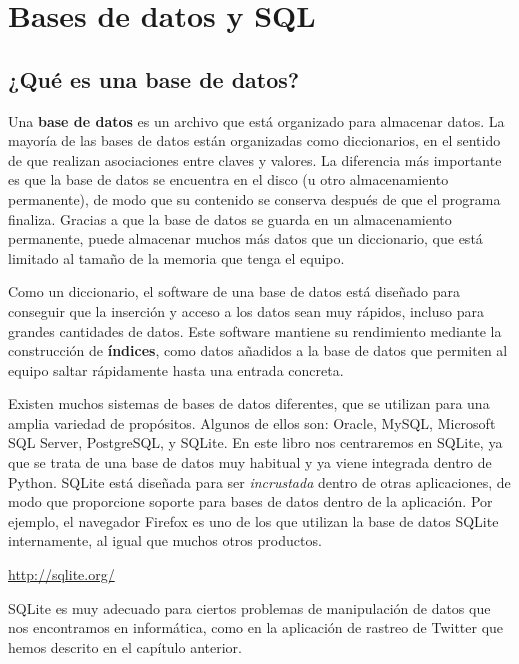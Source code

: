
\chapter{Bases de datos y SQL}

\section{¿Qué es una base de datos?}

Una {\bf base de datos} es un archivo que está organizado para almacenar datos.
La mayoría de las bases de datos están organizadas como diccionarios, en el sentido
de que realizan asociaciones entre claves y valores. La diferencia más importante
es que la base de datos se encuentra en el disco (u otro almacenamiento permanente),
de modo que su contenido se conserva después de que el programa finaliza. Gracias a que la base de
datos se guarda en un almacenamiento permanente, puede almacenar muchos más datos que
un diccionario, que está limitado al tamaño de la memoria
que tenga el equipo.

Como un diccionario, el software de una base de datos está diseñado para conseguir que
la inserción y acceso a los datos sean muy rápidos, incluso para grandes
cantidades de datos. Este software mantiene su rendimiento mediante la
construcción de {\bf índices}, como datos añadidos a la base de datos
que permiten al equipo saltar rápidamente hasta una entrada
concreta.

Existen muchos sistemas de bases de datos diferentes, que se utilizan para una
amplia variedad de propósitos. Algunos de ellos son: Oracle, MySQL, Microsoft SQL Server,
PostgreSQL, y SQLite. En este libro nos centraremos en SQLite, ya que
se trata de una base de datos muy habitual y ya viene integrada dentro de Python.
SQLite está diseñada para ser \emph{incrustada} dentro de otras aplicaciones,
de modo que proporcione soporte para bases de datos dentro de la aplicación. Por ejemplo,
el navegador Firefox es uno de los que utilizan la base de datos SQLite internamente,
al igual que muchos otros productos.

\url{http://sqlite.org/}

SQLite es muy adecuado para ciertos problemas de manipulación de datos que nos
encontramos en informática, como en la aplicación de rastreo de Twitter que
hemos descrito en el capítulo anterior.


